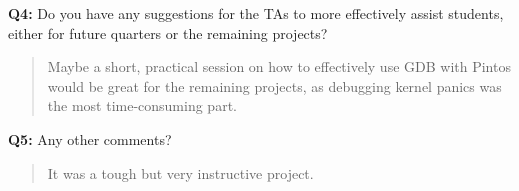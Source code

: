 \documentclass[a4paper,11pt]{paper}
\begin{document}
\textbf{Q4:} Do you have any suggestions for the TAs to more effectively assist
students, either for future quarters or the remaining projects?

\begin{quote}
  Maybe a short, practical session on how to effectively use GDB with Pintos would be great for the remaining projects, as debugging kernel panics was the most time-consuming part.
\end{quote}

\textbf{Q5:} Any other comments?

\begin{quote}
  It was a tough but very instructive project.
\end{quote}
\end{document}
